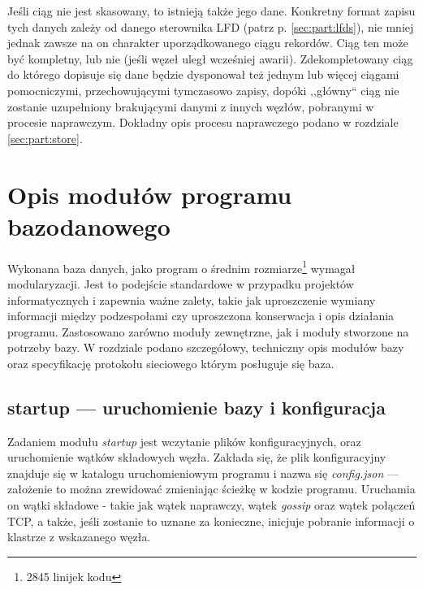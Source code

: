 \documentclass[a4paper,polish,12pt,twoside]{article}
\def \docsection#1{\clearpage\section{#1}}
\begin{document}
	Jeśli ciąg nie jest skasowany, to istnieją także jego dane. Konkretny format zapisu tych danych zależy od danego sterownika LFD (patrz p. \ref{sec:part:lfds}), nie mniej jednak zawsze na on charakter uporządkowanego ciągu rekordów. Ciąg ten może być kompletny, lub nie (jeśli węzeł uległ wcześniej awarii). Zdekompletowany ciąg do którego dopisuje się dane będzie dysponował też jednym lub więcej ciągami pomocniczymi, przechowującymi tymczasowo zapisy, dopóki ,,główny`` ciąg nie zostanie uzupełniony brakującymi danymi z innych węzłów, pobranymi w procesie naprawczym. Dokładny opis procesu naprawczego podano w rozdziale \ref{sec:part:store}.

\docsection{Opis modułów programu bazodanowego}

		Wykonana baza danych, jako program o średnim rozmiarze\footnote{2845 linijek kodu} wymagał modularyzacji. Jest to podejście standardowe w przypadku projektów informatycznych i zapewnia ważne zalety, takie jak uproszczenie wymiany informacji między podzespołami czy uproszczona konserwacja i opis działania programu. Zastosowano zarówno moduły zewnętrzne, jak i moduły stworzone na potrzeby bazy. W rozdziale podano szczegółowy, techniczny opis modułów bazy oraz specyfikację protokołu sieciowego którym posługuje się baza.



	\subsection{startup --- uruchomienie bazy i konfiguracja}
		Zadaniem modułu \textit{startup} jest wczytanie plików konfiguracyjnych, oraz uruchomienie wątków składowych węzła. Zakłada się, że plik konfiguracyjny znajduje się w katalogu uruchomieniowym programu i nazwa się \textit{config.json} --- założenie to można zrewidować zmieniając ścieżkę w kodzie programu. Uruchamia on wątki składowe - takie jak wątek naprawczy, wątek \textit{gossip} oraz wątek połączeń TCP, a także, jeśli zostanie to uznane za konieczne, inicjuje pobranie informacji o klastrze z wskazanego węzła.
\end{document}
